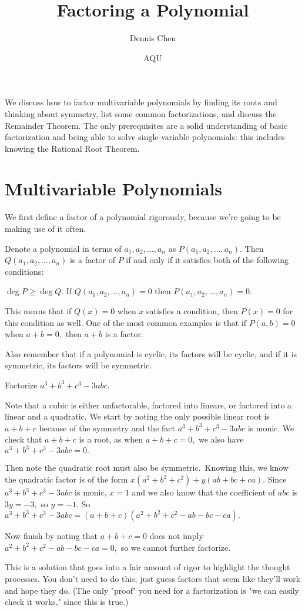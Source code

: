 \documentclass[mast]{lucky}
\title{Factoring a Polynomial}
\author{Dennis Chen}
\date{AQU}
\begin{document}
\maketitle
We discuss how to factor multivariable polynomials by finding its roots and thinking about symmetry, list some common factorizations, and discuss the Remainder Theorem. The only prerequisites are a solid understanding of basic factorization and being able to solve single-variable polynomials: this includes knowing the Rational Root Theorem.

\section{Multivariable Polynomials}
We first define a factor of a polynomial rigorously, because we're going to be making use of it often.

\begin{defi}
Denote a polynomial in terms of $a_1,a_2,\ldots,a_n$ as $P(a_1,a_2,\ldots,a_n).$ Then $Q(a_1,a_2,\ldots,a_n)$ is a factor of $P$ if and only if it satisfies both of the following conditions:
\begin{itemize}
     \Item $\deg P\geq \deg Q.$
     \Item If $Q(a_1,a_2,\ldots,a_n)=0$ then $P(a_1,a_2,\ldots,a_n)=0.$
\end{itemize}
\end{defi}
This means that if $Q(x)=0$ when $x$ satisfies a condition, then $P(x)=0$ for this condition as well. One of the most common examples is that if $P(a,b)=0$ when $a+b=0,$ then $a+b$ is a factor.

Also remember that if a polynomial is cyclic, its factors will be cyclic, and if it is symmetric, its factors will be symmetric.

\begin{exam}
Factorize $a^3+b^3+c^3-3abc.$
\end{exam}

\begin{sol}
Note that a cubic is either unfactorable, factored into linears, or factored into a linear and a quadratic. We start by noting the only possible linear root is $a+b+c$ because of the symmetry and the fact $a^3+b^3+c^3-3abc$ is monic. We check that $a+b+c$ is a root, as when $a+b+c=0,$ we also have $a^3+b^3+c^3-3abc=0.$

Then note the quadratic root must also be symmetric.\footnotemark\, Knowing this, we know the quadratic factor is of the form $x(a^2+b^2+c^2)+y(ab+bc+ca).$ Since $a^3+b^3+c^3-3abc$ is monic, $x=1$ and we also know that the coefficient of $abc$ is $3y=-3,$ so $y=-1.$ So $a^3+b^3+c^3-3abc=(a+b+c)(a^2+b^2+c^2-ab-bc-ca).$

Now finish by noting that $a+b+c=0$ does not imply $a^2+b^2+c^2-ab-bc-ca=0,$ so we cannot further factorize.
\end{sol}
This is a solution that goes into a fair amount of rigor to highlight the thought processes. You don't need to do this; just guess factors that seem like they'll work and hope they do. (The only "proof" you need for a factorization is "we can easily check it works," since this is true.)
\end{document}

